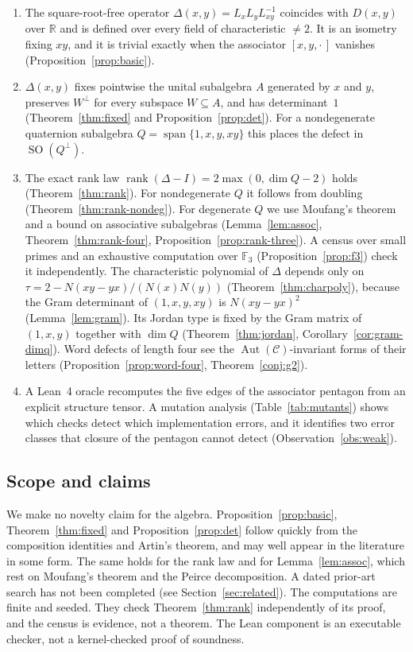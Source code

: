 \documentclass[11pt]{amsart}
\theoremstyle{definition}
\theoremstyle{remark}
\newcommand{\F}{\mathbb{F}}
\newcommand{\R}{\mathbb{R}}
\newcommand{\C}{\mathcal{C}}
\DeclareMathOperator{\rank}{rank}
\DeclareMathOperator{\SO}{SO}
\DeclareMathOperator{\spn}{span}
\begin{document}
\begin{enumerate}[label=(\roman*)]
\item The square-root-free operator $\Delta(x,y)=L_xL_yL_{xy}^{-1}$ coincides
  with $D(x,y)$ over $\R$ and is defined over every field of characteristic
  $\neq2$. It is an isometry fixing $xy$, and it is trivial exactly when the
  associator $[x,y,\cdot\,]$ vanishes (Proposition~\ref{prop:basic}).
\item $\Delta(x,y)$ fixes pointwise the unital subalgebra $A$ generated by $x$
  and $y$, preserves $W^\perp$ for every subspace $W\subseteq A$, and has
  determinant~$1$ (Theorem~\ref{thm:fixed} and
  Proposition~\ref{prop:det}). For a nondegenerate quaternion subalgebra
  $Q=\spn\{1,x,y,xy\}$ this places the defect in $\SO(Q^\perp)$.
\item The exact rank law $\rank(\Delta-I)=2\max(0,\dim Q-2)$ holds
  (Theorem~\ref{thm:rank}). For nondegenerate $Q$ it follows from doubling
  (Theorem~\ref{thm:rank-nondeg}). For degenerate $Q$ we use Moufang's
  theorem and a bound on associative subalgebras (Lemma~\ref{lem:assoc},
  Theorem~\ref{thm:rank-four}, Proposition~\ref{prop:rank-three}). A census
  over small primes and an exhaustive computation over $\F_3$
  (Proposition~\ref{prop:f3}) check it independently. The characteristic
  polynomial of $\Delta$ depends only on $\tau=2-N(xy-yx)/(N(x)N(y))$
  (Theorem~\ref{thm:charpoly}), because the Gram determinant of
  $(1,x,y,xy)$ is $N(xy-yx)^2$ (Lemma~\ref{lem:gram}). Its Jordan type is
  fixed by the Gram matrix of $(1,x,y)$ together with $\dim Q$
  (Theorem~\ref{thm:jordan}, Corollary~\ref{cor:gram-dimq}). Word defects
  of length four see the $\operatorname{Aut}(\C)$-invariant forms of their
  letters (Proposition~\ref{prop:word-four},
  Theorem~\ref{conj:g2}).
\item A Lean~4 oracle recomputes the five edges of the associator pentagon
  from an explicit structure tensor. A mutation analysis
  (Table~\ref{tab:mutants}) shows which checks detect which implementation
  errors, and it identifies two error classes that closure of the pentagon
  cannot detect (Observation~\ref{obs:weak}).
\end{enumerate}

\subsection*{Scope and claims}
We make no novelty claim for the algebra. Proposition~\ref{prop:basic},
Theorem~\ref{thm:fixed} and Proposition~\ref{prop:det} follow quickly from
the composition identities and Artin's theorem, and may well appear in the
literature in some form. The same holds for the rank law and for
Lemma~\ref{lem:assoc}, which rest on Moufang's theorem and the Peirce
decomposition. A dated prior-art search has not been completed (see
Section~\ref{sec:related}). The computations are finite and seeded. They
check Theorem~\ref{thm:rank} independently of its proof, and the census is
evidence, not a theorem. The Lean component is an executable checker, not a
kernel-checked proof of soundness.
\end{document}
